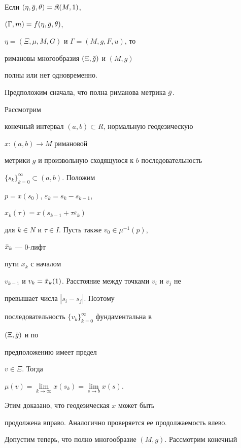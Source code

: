 \begin{lem} Если $(\eta,\Bar g,\theta)=\frak K(M,1)$, 


$(\Gamma,m)=f(\eta,\Bar g,\theta)$, 


$\eta=(\Xi,\mu,M,G)$ и $\Gamma=(M,g,F,u)$, то 


римановы многообразия $(\Xi,\Bar g)$ и $(M,g)$ 


полны или нет одновременно. 


\end{lem} 


 


\begin{pf} Предположим сначала, что полна риманова метрика $\Bar g$. 


Рассмотрим 


конечный интервал $(a,b)\subset R$, нормальную геодезическую 


$x:(a,b)\to M$ римановой 


метрики $g$ и произвольную сходящуюся к $b$ последовательность 


$\{s_k\}^\infty_{k=0}\subset(a,b)$. Положим 


$p=x(s_0)$, $\varepsilon_k=s_k-s_{k-1}$, 


$x_k(\tau)=x(s_{k-1}+\tau\varepsilon_k)$ 


для $k\in N$ и $\tau\in I$. Пусть также $v_0\in\mu^{-1}(p)$, 


$\Bar x_k$ --- 0-лифт 


пути $x_k$ с началом 


$v_{k-1}$ и $v_k=\Bar x_k(1)$. Расстояние между точками $v_i$ и $v_j$ не 


превышает числа $|s_i-s_j|$. Поэтому 


последовательность $\{v_k\}^\infty_{k=0}$ фундаментальна в 


$(\Xi,\Bar g)$ и по 


предположению имеет предел 


$v\in\Xi$. Тогда 


$\mu(v)=\lim\limits_{k\to\infty}x(s_k)=\lim\limits_{s\to b}x(s)$. 


Этим доказано, что геодезическая $x$ может быть 


продолжена вправо. Аналогично проверяется ее продолжаемость влево. 


 


Допустим теперь, что полно многообразие $(M,g)$. Рассмотрим конечный 



\end{pf}
